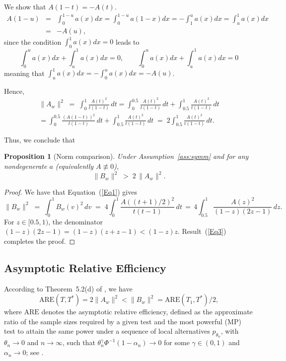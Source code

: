 \documentclass[12pt]{article}
\theoremstyle{remark}
\theoremstyle{plain}
\newtheorem{proposition}{Proposition}[section]
\begin{document}
We show that  $A(1-t)=-A(t)$.
\begin{eqnarray*}\nonumber
	A(1-u)&=&\int_{0}^{1-u} a\left(x\right)dx=\int_{0}^{1-u} a\left(1-x\right)dx=
	-\int_{1}^{u} a\left(x\right)dx=\int_{u}^{1} a\left(x\right)dx\\
	&=&-A(u),
	\label{Eq2}
\end{eqnarray*}
since 
the condition 
\(\int_{0}^1a(x)dx=0\) leads to 
\[\int_{0}^{u}a(x)dx+\int_{u}^{1}a(x)dx=0, \qquad 
\int_{0}^{u}a(x)dx+\int_{u}^{1}a(x)dx=0
\]
meaning that \(\int_{u}^1a(x)dx=-\int_{0}^ua(x)dx=-A(u)\).

Hence,
\begin{eqnarray}\nonumber
	\|A_w\|^2 \;=\; \int_0^1 \frac{A(t)^2}{t(1-t)}\,dt =
	\int_0^{0.5}\frac{A(t)^2}{t(1-t)}\,dt +\int_{0.5}^{1}\frac{A(t)^2}{t(1-t)}\,dt 
	\\
	=\int_0^{0.5}\frac{\left(A(1-t)\right)^2}{t(1-t)}\,dt +\int_{0.5}^{1}\frac{A(t)^2}{t(1-t)}\,dt 
	\;=\; 2\int_{0.5}^{1} \frac{A(t)^2}{t(1-t)}\,dt.
	\label{Eq3}
\end{eqnarray}

Thus, we conclude that
\begin{proposition}[Norm comparison]
	\label{thm:norm}
	Under Assumption~\ref{ass:symm} and for any nondegenerate $a$ (equivalently $A\not\equiv 0$),
	\[
	\|B_w\|^2 \;>\; 2\,\|A_w\|^2.
	\]
\end{proposition}
\begin{proof}
	We have that Equation~(\ref{Eq1}) gives	
	\[
	\|B_w\|^2 \;=\; \int_0^1 B_w(v)^2\,dv 
	\;=\; 4\int_{0}^{1}  \frac{A\left((t+1)/2\right)^2}{t(t-1)}\,dt\,=\,
	4\int_{0.5}^{1}  \frac{A\left(z\right)^2}{(1-z)(2z-1)}\,dz.
	\]
	For $z\in[0.5,1)$, the denominator $(1-z)(2z-1)=(1-z)(z+z-1)< (1-z)z$. Result~(\ref{Eq3})
	completes the proof.	
\end{proof}



\subsection{Asymptotic Relative Efficiency}
According to Theorem~5.2(d) of \citet{inglot2000vanishing}, we have
\[
\text{ARE}(T,T^{\ast}) = 2\|A_w\|^2 < \|B_w\|^2 = \text{ARE}(T_1,T^{\ast})/2,
\]
where $\text{ARE}$ denotes the asymptotic relative efficiency, defined as the approximate ratio of the sample sizes required by a given test and the most powerful (MP) test to attain the same power under a sequence of local alternatives $p_{\theta_n}$, with $\theta_n \to 0$ and $n \to \infty$, such that $\theta_n^\gamma \Phi^{-1}(1-\alpha_n)\to 0$ for some $\gamma \in (0,1)$ and $\alpha_n \to 0$; see \citet[p.~231]{inglot2000vanishing}.
\end{document}
